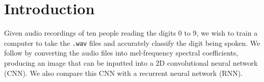 \section{Introduction}
Given audio recordings of ten people reading the digits 0 to 9, we wish to train a computer to take the \texttt{.wav} files and accurately classify the digit being spoken. We follow \cite{abdel2014convolutional} by converting the audio files into mel-frequency spectral coefficients, producing an image that can be inputted into a 2D convolutional neural network (CNN). We also compare this CNN with a recurrent neural network (RNN). 
